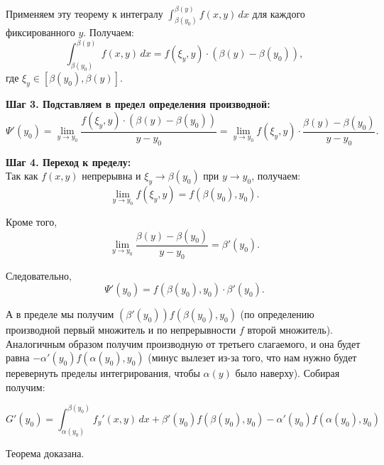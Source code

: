 \documentclass{article}
\begin{document}
Применяем эту теорему к интегралу \(\int_{\beta(y_0)}^{\beta(y)} f(x, y) \, dx\) для каждого фиксированного \(y\). Получаем:
\[
\int_{\beta(y_0)}^{\beta(y)} f(x, y) \, dx = f(\xi_y, y) \cdot (\beta(y) - \beta(y_0)),
\]
где \(\xi_y \in [\beta(y_0), \beta(y)]\).

\textbf{Шаг 3. Подставляем в предел определения производной:}
\[
\Psi'(y_0) = \lim_{y \to y_0} \frac{f(\xi_y, y) \cdot (\beta(y) - \beta(y_0))}{y - y_0} = \lim_{y \to y_0} f(\xi_y, y) \cdot \frac{\beta(y) - \beta(y_0)}{y - y_0}.
\]

\textbf{Шаг 4. Переход к пределу:} \\
Так как \(f(x, y)\) непрерывна и \(\xi_y \to \beta(y_0)\) при \(y \to y_0\), получаем:
\[
\lim_{y \to y_0} f(\xi_y, y) = f(\beta(y_0), y_0).
\]

Кроме того,
\[
\lim_{y \to y_0} \frac{\beta(y) - \beta(y_0)}{y - y_0} = \beta'(y_0).
\]

Следовательно,
\[
\Psi'(y_0) = f(\beta(y_0), y_0) \cdot \beta'(y_0).
\]

А в пределе мы получим $(\beta'(y_0)) f(\beta(y_0), y_0)$ (по определению производной первый множитель и по непрерывности $f$ второй множитель). Аналогичным образом получим производную от третьего слагаемого, и она будет равна $-\alpha'(y_0) f(\alpha(y_0), y_0)$ (минус вылезет из-за того, что нам нужно будет перевернуть пределы интегрирования, чтобы $\alpha(y)$ было наверху). Собирая получим:

\[
G'(y_0) = \int_{\alpha(y_0)}^{\beta(y_0)} f_y'(x, y) \, dx + \beta'(y_0) f(\beta(y_0), y_0) - \alpha'(y_0) f(\alpha(y_0), y_0)
\]

Теорема доказана.
\end{document}
